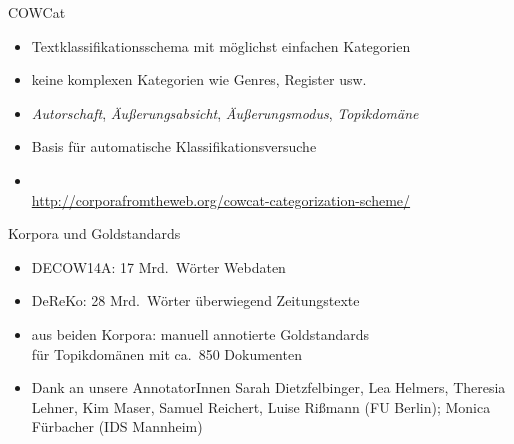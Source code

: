\documentclass{beamer}
\begin{document}
\begin{frame}
  {COWCat}
  \begin{itemize}
    \item Textklassifikationsschema mit möglichst einfachen Kategorien
    \item keine komplexen Kategorien wie Genres, Register usw.
    \item \textit{Autorschaft}, \textit{Äußerungsabsicht}, \textit{Äußerungsmodus}, \alert{\textit{Topikdomäne}}
      \vspace{0.5cm}
    \item Basis für automatische Klassifikationsversuche
      \vspace{0.5cm}
    \item \cite{Sharoff2006,SchaeferBildhauer2012a}\\
      {\footnotesize \url{http://corporafromtheweb.org/cowcat-categorization-scheme/}}
  \end{itemize}
\end{frame}

\begin{frame}
  {Korpora und Goldstandards}
  \begin{itemize}
    \item DECOW14A: 17 Mrd.\ Wörter Webdaten\\
      \citep{SchaeferBildhauer2012a,SchaeferBildhauer2013de,Schaefer2015b}
    \item DeReKo: 28 Mrd.\ Wörter überwiegend Zeitungstexte\\
      \citep{KupietzEa2010}
      \vspace{0.5cm}
    \item aus beiden Korpora: manuell annotierte Goldstandards\\
      für Topikdomänen mit ca.\ 850 Dokumenten
      \vspace{0.5cm}
    \item {\footnotesize Dank an unsere AnnotatorInnen Sarah Dietzfelbinger, Lea Helmers, Theresia Lehner, Kim Maser, Samuel Reichert, Luise Rißmann (FU Berlin); Monica Fürbacher (IDS Mannheim)}
  \end{itemize}
\end{frame}
\end{document}

